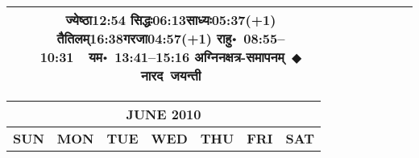 \documentclass[a3paper,12pt,landscape]{article}
\newcommand{\eventsep}{~$\Diamondblack$ }
\newcommand{\To}{\hspace{1pt}\raisebox{0pt}{\tiny\RIGHTarrow}\hspace{1pt}}
\newcommand{\rahuyama}[2]{%
{राहु॰~\textsf{#1}~~यम॰~\textsf{#2}}
}
\begin{document}
\begin{center}
\begin{tabular}{|c|c|c|c|c|c|c|}
{{\mbox{ज्येष्ठा\To{}\textsf{12:54\hspace{2ex}}}}%
{\mbox{सिद्धः\To{}\textsf{06:13\hspace{2ex}}}\mbox{साध्यः\To{}\textsf{05:37(+1)\hspace{2ex}}}}%
{\mbox{तैतिलम्\To{}\textsf{16:38\hspace{2ex}}}\mbox{गरजा\To{}\textsf{04:57(+1)\hspace{2ex}}}}}%
{\rahuyama{08:55--10:31}{13:41--15:16}}%
{अग्निनक्षत्र-समापनम्\eventsep नारद~जयन्ती}
\\ \hline %
\end{tabular}



\begin{tabular}{|c|c|c|c|c|c|c|}
\multicolumn{7}{c}{\Large \bfseries \sffamily JUNE 2010}\\[3mm]
\hline
\textbf{\textsf{SUN}} & \textbf{\textsf{MON}} & \textbf{\textsf{TUE}} & \textbf{\textsf{WED}} & \textbf{\textsf{THU}} & \textbf{\textsf{FRI}} & \textbf{\textsf{SAT}} \\ \hline


\end{tabular}
\end{center}
\end{document}
